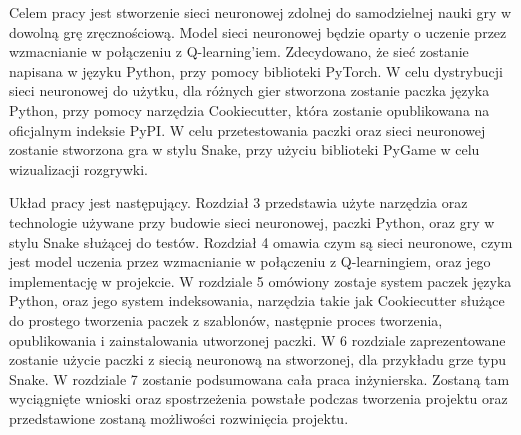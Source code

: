 Celem pracy jest stworzenie sieci neuronowej zdolnej do samodzielnej nauki gry w dowolną grę zręcznościową. Model sieci neuronowej będzie oparty o uczenie przez wzmacnianie w połączeniu z Q-learning'iem. Zdecydowano, że sieć zostanie napisana w języku Python, przy pomocy biblioteki PyTorch. W celu dystrybucji sieci neuronowej do użytku, dla różnych gier stworzona zostanie paczka języka Python, przy pomocy narzędzia Cookiecutter, która zostanie opublikowana na oficjalnym indeksie PyPI. W celu przetestowania paczki oraz sieci neuronowej zostanie stworzona gra w stylu Snake, przy użyciu biblioteki PyGame w celu wizualizacji rozgrywki.
\newline

Układ pracy jest następujący. Rozdział 3 przedstawia użyte narzędzia oraz technologie używane przy budowie sieci neuronowej, paczki Python, oraz gry w stylu Snake służącej do testów. Rozdział 4 omawia czym są sieci neuronowe, czym jest model uczenia przez wzmacnianie w połączeniu z Q-learningiem, oraz jego implementację w projekcie. W rozdziale 5 omówiony zostaje system paczek języka Python, oraz jego system indeksowania, narzędzia takie jak Cookiecutter służące do prostego tworzenia paczek z szablonów, następnie proces tworzenia, opublikowania i zainstalowania utworzonej paczki. W 6 rozdziale zaprezentowane zostanie użycie paczki z siecią neuronową na stworzonej, dla przykładu grze typu Snake. W rozdziale 7 zostanie podsumowana cała praca inżynierska. Zostaną tam wyciągnięte wnioski oraz spostrzeżenia powstałe podczas tworzenia projektu oraz przedstawione zostaną możliwości rozwinięcia projektu.

